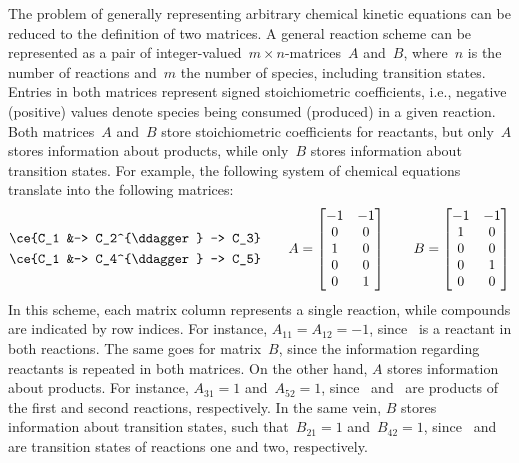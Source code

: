 The problem of generally representing arbitrary chemical kinetic equations can be reduced to the definition of two matrices.
A general reaction scheme can be represented as a pair of integer-valued~$m \times n$-matrices~$A$ and~$B$,
where~$n$ is the number of reactions and~$m$ the number of species,
including transition states.
Entries in both matrices represent signed stoichiometric coefficients,
i.e.,
negative (positive) values denote species being consumed (produced) in a given reaction.
Both matrices~$A$ and~$B$ store stoichiometric coefficients for reactants,
but only~$A$ stores information about products,
while only~$B$ stores information about transition states.
For example,
the following system of chemical equations translate into the following matrices:
% 
\begin{equation}
	\begin{split}
		\ce{C_1 &-> C_2^{\ddagger} -> C_3} \\
		\ce{C_1 &-> C_4^{\ddagger} -> C_5} \\
	\end{split}
	\qquad
	A = \begin{bmatrix}
		-1 & -1 \\
		0  & 0  \\
		1  & 0  \\
		0  & 0  \\
		0  & 1
	\end{bmatrix}
	\qquad
	B = \begin{bmatrix}
		-1 & -1 \\
		1  & 0  \\
		0  & 0  \\
		0  & 1  \\
		0  & 0
	\end{bmatrix}
\end{equation}
% 
In this scheme,
each matrix column represents a single reaction,
while compounds are indicated by row indices.
For instance,
$A_{11} = A_{12} = -1$,
since~ is a reactant in both reactions.
The same goes for matrix~$B$,
since the information regarding reactants is repeated in both matrices.
On the other hand,
$A$ stores information about products.
For instance,
$A_{31} = 1$ and~$A_{52} = 1$,
since~ and~ are products of the first and second reactions,
respectively.
In the same vein,
$B$ stores information about transition states,
such that~$B_{21} = 1$ and~$B_{42} = 1$,
since~ and~ are transition states of reactions one and two,
respectively.

